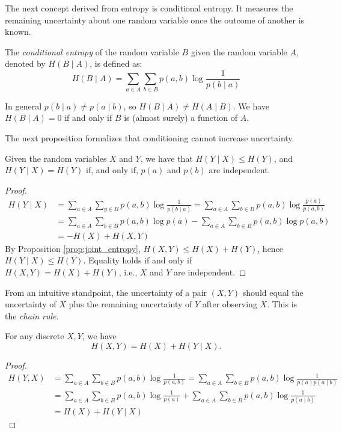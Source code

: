 
The next concept derived from entropy is conditional entropy. It measures the remaining uncertainty about one random variable once the outcome of another is known.

\begin{definition}
The \emph{conditional entropy} of the random variable $B$ given the random variable $A$, denoted by $H(B \mid A)$, is defined as:
\[
H(B \mid A) = \sum_{a \in A} \sum_{b \in B} p(a, b) \log \frac{1}{p(b \mid a)}
\]
\end{definition}

In general $p(b\mid a)\neq p(a\mid b)$, so $H(B \mid A)\neq H(A \mid B)$. We have $H(B \mid A) = 0$ if and only if $B$ is (almost surely) a function of $A$.

The next proposition formalizes that conditioning cannot increase uncertainty.

\begin{proposition}
Given the random variables $X$ and $Y$, we have that $H(Y \mid X) \leq H(Y)$, and $H(Y \mid X) = H(Y)$ if, and only if, $p(a)$ and $p(b)$ are independent.
\end{proposition}
\begin{proof}
\begin{equation*}
\begin{split}
H(Y \mid X) & = \sum_{a \in A} \sum_{y \in B} p(a, b) \log \frac{1}{p(b \mid a)} = \sum_{a \in A} \sum_{b \in B} p(a, b) \log \frac{p(a)}{p(a, b)} \\
& = \sum_{a \in A} \sum_{b \in B} p(a, b) \log p(a) - \sum_{a \in A} \sum_{b \in B} p(a, b) \log p(a, b) \\
& = -H(X) + H(X, Y)
\end{split}
\end{equation*}
By Proposition \ref{prop:joint_entropy}, $H(X,Y)\le H(X)+H(Y)$, hence $H(Y\mid X)\le H(Y)$. Equality holds if and only if $H(X,Y)=H(X)+H(Y)$, i.e., $X$ and $Y$ are independent.
\end{proof}

From an intuitive standpoint, the uncertainty of a pair $(X,Y)$ should equal the uncertainty of $X$ plus the remaining uncertainty of $Y$ after observing $X$. This is the \emph{chain rule}.

\begin{proposition}
\label{prop:chain_rule_entropy}
For any discrete $X,Y$, we have
\[
H(X,Y)=H(X)+H(Y\mid X).
\]
\end{proposition}
\begin{proof}
\begin{equation*}
\begin{split}
H(Y, X) & = \sum_{a \in A} \sum_{b \in B} p(a, b) \log \frac{1}{p(a, b)} = \sum_{a \in A} \sum_{b \in B} p(a, b) \log \frac{1}{p(a) p(a \mid b)} \\
& = \sum_{a \in A} \sum_{b \in B} p(a, b) \log \frac{1}{p(a)} + \sum_{a \in A} \sum_{b \in B} p(a, b) \log \frac{1}{p(a \mid b)} \\
& = H(X) + H(Y \mid X)
\end{split}
\end{equation*}
\end{proof}

